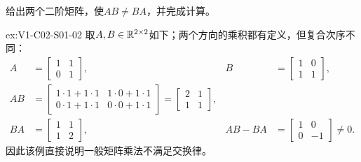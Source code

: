 \begin{SLChapterExercisePairSection}
\begin{exercise}[乘法次序]\label{ex:V1-C02-S01-02}
给出两个二阶矩阵，使$AB\ne BA$，并完成计算。
\end{exercise}
\label{sol:V1-C02-S01-02}
\begin{chapterexercisesolution}{ex:V1-C02-S01-02}
取$A,B\in\mathbb{R}^{2\times2}$如下；两个方向的乘积都有定义，但复合次序不同：
\[
\begin{aligned}
A&=\begin{bmatrix}1&1\\0&1\end{bmatrix},
&B&=\begin{bmatrix}1&0\\1&1\end{bmatrix},\\
AB&=\begin{bmatrix}1\cdot1+1\cdot1&1\cdot0+1\cdot1\\
0\cdot1+1\cdot1&0\cdot0+1\cdot1\end{bmatrix}
=\begin{bmatrix}2&1\\1&1\end{bmatrix},\\
BA&=\begin{bmatrix}1&1\\1&2\end{bmatrix},
&AB-BA&=\begin{bmatrix}1&0\\0&-1\end{bmatrix}\ne0.
\end{aligned}
\]
因此该例直接说明一般矩阵乘法不满足交换律。
\end{chapterexercisesolution}


\end{SLChapterExercisePairSection}
